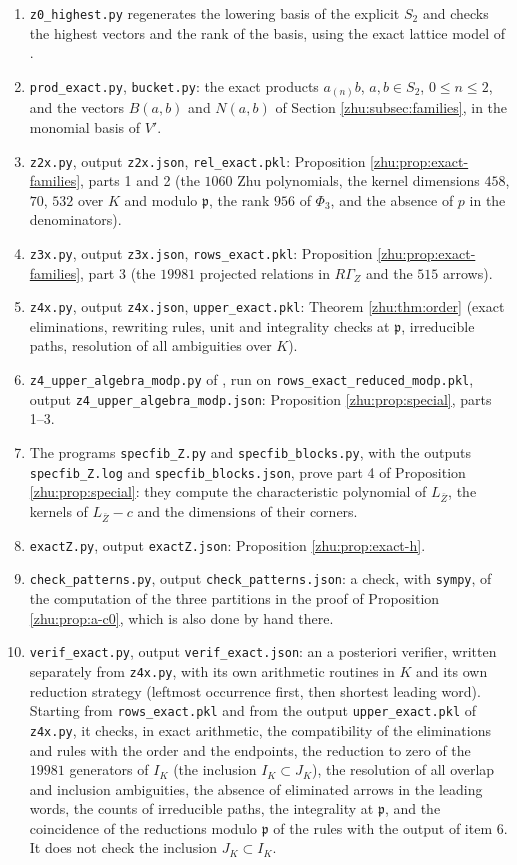\documentclass[leqno]{article}
\renewcommand{\leq}{\ensuremath{\leqslant}}
\numberwithin{equation}{section}
\begin{document}
\begin{enumerate}
\item \texttt{z0\_highest.py} regenerates the lowering basis of the explicit $S_2$ and checks the highest vectors and the rank of the basis, using the exact lattice model of \cite{Arh26}.
\item \texttt{prod\_exact.py}, \texttt{bucket.py}: the exact products $a_{(n)}b$, $a, b \in S_2$, $0 \leq n \leq 2$, and the vectors $B(a,b)$ and $N(a,b)$ of Section \ref{zhu:subsec:families}, in the monomial basis of $V'$.
\item \texttt{z2x.py}, output \texttt{z2x.json}, \texttt{rel\_exact.pkl}: Proposition \ref{zhu:prop:exact-families}, parts 1 and 2 (the $1060$ Zhu polynomials, the kernel dimensions $458$, $70$, $532$ over $K$ and modulo $\mathfrak p$, the rank $956$ of $\Phi_3$, and the absence of $p$ in the denominators).
\item \texttt{z3x.py}, output \texttt{z3x.json}, \texttt{rows\_exact.pkl}: Proposition \ref{zhu:prop:exact-families}, part 3 (the $19981$ projected relations in $R\Gamma_Z$ and the $515$ arrows).
\item \texttt{z4x.py}, output \texttt{z4x.json}, \texttt{upper\_exact.pkl}: Theorem \ref{zhu:thm:order} (exact eliminations, rewriting rules, unit and integrality checks at $\mathfrak p$, irreducible paths, resolution of all ambiguities over $K$).
\item \texttt{z4\_upper\_algebra\_modp.py} of \cite{Arh26}, run on \texttt{rows\_exact\_reduced\_modp.pkl}, output \texttt{z4\_upper\_algebra\_modp.json}: Proposition \ref{zhu:prop:special}, parts 1--3.
\item The programs \texttt{specfib\_Z.py} and \texttt{specfib\_blocks.py}, with the outputs \texttt{specfib\_Z.log} and \texttt{specfib\_blocks.json}, prove part 4 of Proposition \ref{zhu:prop:special}: they compute the characteristic polynomial of $L_{\bar Z}$, the kernels of $L_{\bar Z} - c$ and the dimensions of their corners.
\item \texttt{exactZ.py}, output \texttt{exactZ.json}: Proposition \ref{zhu:prop:exact-h}.
\item \texttt{check\_patterns.py}, output \texttt{check\_patterns.json}: a check, with \texttt{sympy}, of the computation of the three partitions in the proof of Proposition \ref{zhu:prop:a-c0}, which is also done by hand there.
\item \texttt{verif\_exact.py}, output \texttt{verif\_exact.json}: an a posteriori verifier, written separately from \texttt{z4x.py}, with its own arithmetic routines in $K$ and its own reduction strategy (leftmost occurrence first, then shortest leading word). Starting from \texttt{rows\_exact.pkl} and from the output \texttt{upper\_exact.pkl} of \texttt{z4x.py}, it checks, in exact arithmetic, the compatibility of the eliminations and rules with the order and the endpoints, the reduction to zero of the $19981$ generators of $I_K$ (the inclusion $I_K \subset J_K$), the resolution of all overlap and inclusion ambiguities, the absence of eliminated arrows in the leading words, the counts of irreducible paths, the integrality at $\mathfrak p$, and the coincidence of the reductions modulo $\mathfrak p$ of the rules with the output of item 6. It does not check the inclusion $J_K \subset I_K$.

\end{enumerate}
\end{document}
